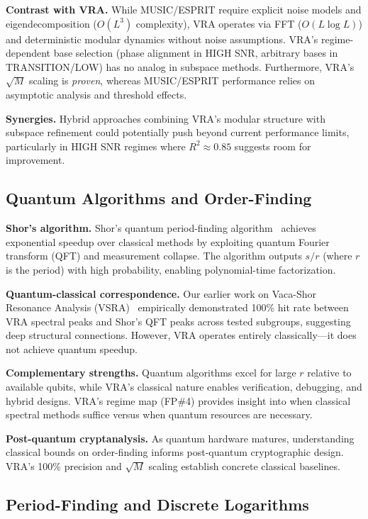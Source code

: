\textbf{Contrast with VRA.} While MUSIC/ESPRIT require explicit noise models and eigendecomposition ($O(L^3)$ complexity), VRA operates via FFT ($O(L \log L)$) and deterministic modular dynamics without noise assumptions. VRA's regime-dependent base selection (phase alignment in HIGH SNR, arbitrary bases in TRANSITION/LOW) has no analog in subspace methods. Furthermore, VRA's $\sqrt{M}$ scaling is \emph{proven}, whereas MUSIC/ESPRIT performance relies on asymptotic analysis and threshold effects.

\textbf{Synergies.} Hybrid approaches combining VRA's modular structure with subspace refinement could potentially push beyond current performance limits, particularly in HIGH SNR regimes where $R^2 \approx 0.85$ suggests room for improvement.

\subsection{Quantum Algorithms and Order-Finding}

\textbf{Shor's algorithm.} Shor's quantum period-finding algorithm~\cite{shor1997quantum} achieves exponential speedup over classical methods by exploiting quantum Fourier transform (QFT) and measurement collapse. The algorithm outputs $s/r$ (where $r$ is the period) with high probability, enabling polynomial-time factorization.

\textbf{Quantum-classical correspondence.} Our earlier work on Vaca-Shor Resonance Analysis (VSRA)~\cite{vaca2024vsra} empirically demonstrated 100\% hit rate between VRA spectral peaks and Shor's QFT peaks across tested subgroups, suggesting deep structural connections. However, VRA operates entirely classically---it does not achieve quantum speedup.

\textbf{Complementary strengths.} Quantum algorithms excel for large $r$ relative to available qubits, while VRA's classical nature enables verification, debugging, and hybrid designs. VRA's regime map (FP\#4) provides insight into when classical spectral methods suffice versus when quantum resources are necessary.

\textbf{Post-quantum cryptanalysis.} As quantum hardware matures, understanding classical bounds on order-finding informs post-quantum cryptographic design. VRA's 100\% precision and $\sqrt{M}$ scaling establish concrete classical baselines.

\subsection{Period-Finding and Discrete Logarithms}

